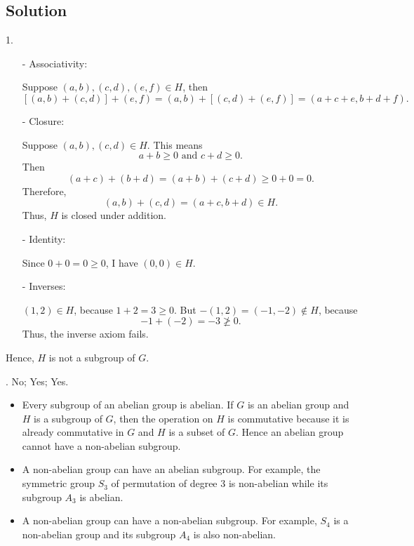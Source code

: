 \documentclass[12pt]{article}
\begin{document}
		\subsection{Solution}
		1. \begin{itemize}
			\item[-] Associativity: 
			\par Suppose $(a, b),(c, d),(e,f) \in H$, then $$\left[ (a, b)+(c, d)\right]  +(e,f) = (a, b)+\left[ (c, d)+(e,f)\right] = (a+c+e,b+d+f).$$
			\item[-] Closure:
			\par Suppose $(a, b),(c, d) \in H$. This means $$a + b \geqslant 0\text{ and }c + d \geqslant 0.$$ Then $$(a + c) + (b + d) = (a + b) + (c + d) \geqslant 0 + 0 = 0.$$ Therefore, $$(a, b) + (c, d) = (a + c, b + d) \in H.$$ Thus, $H$ is closed under addition.
			\item[-] Identity:
			\par Since $0 + 0 = 0 \geqslant 0$, I have $(0, 0) \in H$.
			\item[-] Inverses: 
			\par $(1, 2) \in H$, because $1 + 2 = 3 \geqslant 0$. But $−(1, 2) = (−1, −2) \notin H$, because $$−1 + (−2) = −3 \not\geqslant 0.$$ Thus, the inverse axiom fails.
		\end{itemize}
		\par Hence, $H$ is not a subgroup of $G$.
		\par {}. No; Yes; Yes. \begin{itemize}
			\item Every subgroup of an abelian group is abelian. If $G$ is an abelian group and $H$ is a subgroup of $G$, then the operation on $H$ is commutative because it is already commutative in $G$ and $H$ is a subset of $G$. Hence an abelian group cannot have a non-abelian subgroup.
			\item A non-abelian group can have an abelian subgroup. For example, the symmetric group $S_3$ of permutation of degree 3 is non-abelian while its subgroup $A_3$ is abelian.
			\item A non-abelian group can have a non-abelian subgroup. For example, $S_4$ is a non-abelian group and its subgroup $A_4$ is also non-abelian.
		\end{itemize}
		\par \vv 
\end{document}
